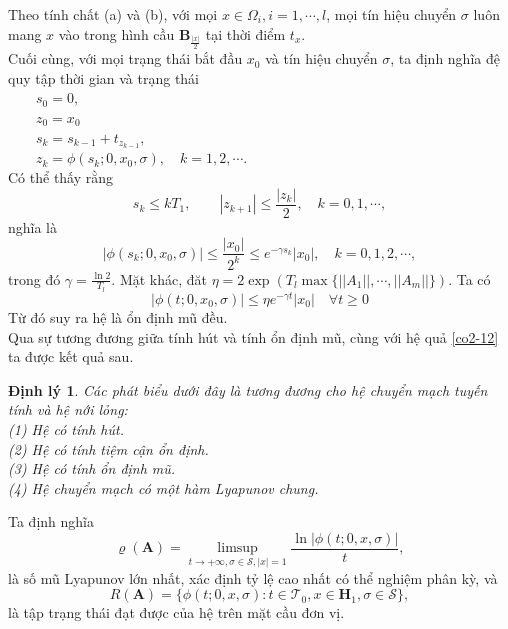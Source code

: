 \documentclass[14pt,a4paper,oneside]{report}		%
\newtheorem{theorem}{Định lý}[chapter]\theoremstyle{definition}
\begin{document}
Theo tính chất (a) và (b), với mọi $x\in\Omega_i, i=1,\cdots,l$, mọi tín hiệu chuyển $\sigma$ luôn mang $x$ vào trong hình cầu $\mathbf{B}_{\frac{|x|}{2}}$ tại thời điểm $t_x$.\\

Cuối cùng, với mọi trạng thái bắt đầu $x_0$ và tín hiệu chuyển $\sigma$, ta định nghĩa đệ quy tập thời gian và trạng thái\\
$\qquad s_0=0,$\\
$\qquad z_0=x_0$\\
$\qquad s_k=s_{k-1}+t_{z_{k-1}},$\\
$\qquad z_k = \phi (s_k;0,x_0,\sigma),\quad k=1,2,\cdots.$\\
Có thể thấy rằng
\begin{equation} \label{eq2-26}
s_k \leq kT_1,\qquad |z_{k+1}|\leq \frac{|z_k|}{2}, \quad k=0,1,\cdots,
\end{equation}
nghĩa là 
$$|\phi(s_k;0,x_0,\sigma)|\leq\frac{|x_0|}{2^k}\leq e^{-\gamma s_k}|x_0|,\quad k=0,1,2,\cdots,$$
trong đó $\gamma = \frac{\ln 2}{T_l}$. Mặt khác, đăt $\eta = 2\exp(T_l\max\{||A_1||,\cdots,||A_m||\})$. Ta có
\begin{equation} \label{eq2-27}
|\phi (t;0,x_0,\sigma)|\leq \eta e^{-\gamma t}|x_0|\quad \forall t\geq 0
\end{equation}
Từ đó suy ra hệ là ổn định mũ đều.\\

Qua sự tương đương giữa tính hút và tính ổn định mũ, cùng với hệ quả \ref{co2-12} ta được kết quả sau.

\begin{theorem}\label{the2-15}
Các phát biểu dưới đây là tương đương cho hệ chuyển mạch tuyến tính và hệ nới lỏng:\\
(1) Hệ có tính hút.\\
(2) Hệ có tính tiệm cận ổn định.\\
(3) Hệ có tính ổn định mũ.\\
(4) Hệ chuyển mạch có một hàm Lyapunov chung.
\end{theorem}
Ta định nghĩa
\begin{equation}\label{eq2-28}
\varrho (\mathbf{A})=\limsup_{t\rightarrow +\infty,\sigma\in\mathcal{S},|x|=1}\frac{\ln|\phi(t;0,x,\sigma)|}{t},
\end{equation}
là số mũ Lyapunov lớn nhất, xác định tỷ lệ cao nhất có thể nghiệm phân kỳ, và
\begin{equation}\label{eq2-29}
R(\mathbf{A})=\{\phi (t;0,x,\sigma):t\in\mathcal{T}_0,x\in\mathbf{H}_1,\sigma\in\mathcal{S}\},
\end{equation}
là tập trạng thái đạt được của hệ trên mặt cầu đơn vị.
\end{document}
